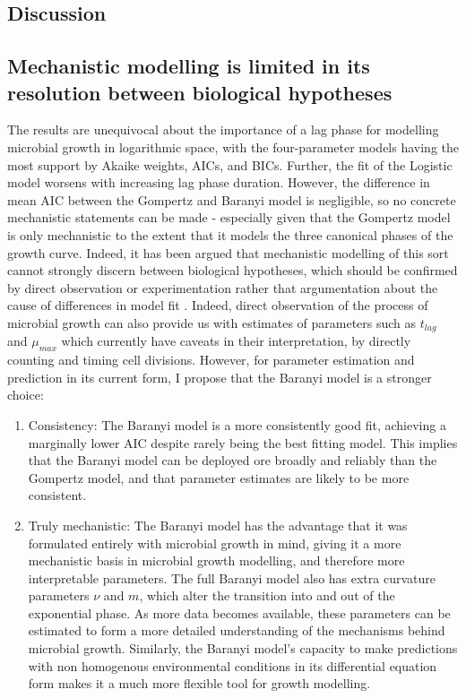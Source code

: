 \documentclass[11pt, a4paper]{article}
\begin{document}
\begin{linenumbers}
\section{Discussion}
\subsection{Mechanistic modelling is limited in its resolution between biological hypotheses}
The results are unequivocal about the importance of a lag phase for modelling microbial growth in logarithmic space, with the four-parameter models having the most support by Akaike weights, AICs, and BICs. Further, the fit of the Logistic model worsens with increasing lag phase duration. However, the difference in mean AIC between the Gompertz and Baranyi model is negligible, so no concrete mechanistic statements can be made - especially given that the Gompertz model is only mechanistic to the extent that it models the three canonical phases of the growth curve. Indeed, it has been argued that mechanistic modelling of this sort cannot strongly discern between biological hypotheses, which should be confirmed by direct observation or experimentation rather that argumentation about the cause of differences in model fit \cite{MicrobialGrowth}. Indeed, direct observation of the process of microbial growth can also provide us with estimates of parameters such as $t_{lag}$ and $\mu_{max}$ which currently have caveats in their interpretation, by directly counting and timing cell divisions. However, for parameter estimation and prediction in its current form, I propose that the Baranyi model is a stronger choice:

\begin{enumerate}
\item{Consistency: }
The Baranyi model is a more consistently good fit, achieving a marginally lower AIC despite rarely being the best fitting model. This implies that the Baranyi model can be deployed ore broadly and reliably than the Gompertz model, and that parameter estimates are likely to be more consistent.

\item{Truly mechanistic: }
The Baranyi model has the advantage that it was formulated entirely with microbial growth in mind, giving it a more mechanistic basis in microbial growth modelling, and therefore more interpretable parameters. The full Baranyi model also has extra curvature parameters $\nu$ and $m$, which alter the transition into and out of the exponential phase. As more data becomes available, these parameters can be estimated to form a more detailed understanding of the mechanisms behind microbial growth. Similarly, the Baranyi model's capacity to make predictions with non homogenous environmental conditions in its differential equation form makes it a much more flexible tool for growth modelling. 


\end{enumerate}
\end{linenumbers}
\end{document}
